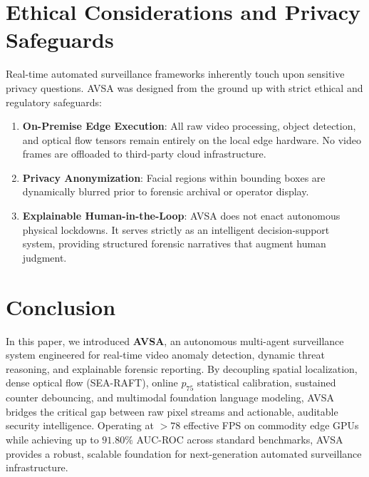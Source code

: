 \documentclass[conference]{IEEEtran}
\begin{document}
\section{Ethical Considerations and Privacy Safeguards}
Real-time automated surveillance frameworks inherently touch upon sensitive privacy questions. AVSA was designed from the ground up with strict ethical and regulatory safeguards:
\begin{enumerate}
    \item \textbf{On-Premise Edge Execution}: All raw video processing, object detection, and optical flow tensors remain entirely on the local edge hardware. No video frames are offloaded to third-party cloud infrastructure.
    \item \textbf{Privacy Anonymization}: Facial regions within bounding boxes are dynamically blurred prior to forensic archival or operator display.
    \item \textbf{Explainable Human-in-the-Loop}: AVSA does not enact autonomous physical lockdowns. It serves strictly as an intelligent decision-support system, providing structured forensic narratives that augment human judgment.
\end{enumerate}

\section{Conclusion}
In this paper, we introduced \textbf{AVSA}, an autonomous multi-agent surveillance system engineered for real-time video anomaly detection, dynamic threat reasoning, and explainable forensic reporting. By decoupling spatial localization, dense optical flow (SEA-RAFT), online $p_{75}$ statistical calibration, sustained counter debouncing, and multimodal foundation language modeling, AVSA bridges the critical gap between raw pixel streams and actionable, auditable security intelligence. Operating at $>78$ effective FPS on commodity edge GPUs while achieving up to $91.80\%$ AUC-ROC across standard benchmarks, AVSA provides a robust, scalable foundation for next-generation automated surveillance infrastructure.
\end{document}
